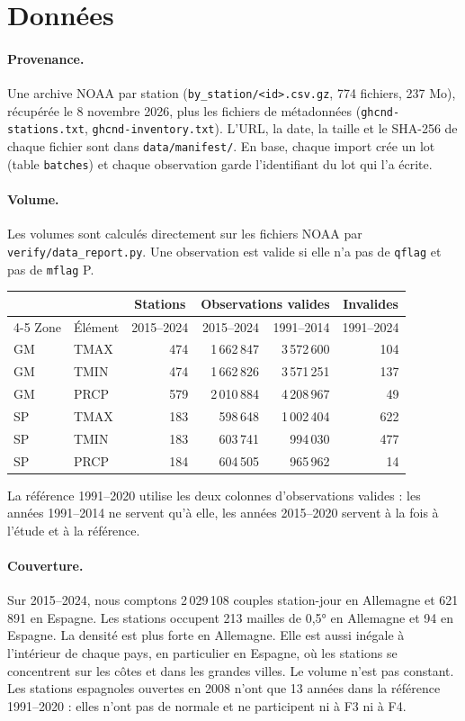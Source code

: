 \documentclass{rapportClass}
\newcommand{\cmd}[1]{\texttt{#1}}
\begin{document}
\section{Données}

\paragraph{Provenance.} Une archive NOAA par station (\cmd{by\_station/<id>.csv.gz}, 774 fichiers, 237 Mo),
récupérée le 8 novembre 2026, plus les fichiers de métadonnées (\cmd{ghcnd-stations.txt}, \cmd{ghcnd-inventory.txt}).
L'URL, la date, la taille et le SHA-256 de chaque fichier sont dans \cmd{data/manifest/}. En base, chaque import
crée un lot (table \cmd{batches}) et chaque observation garde l'identifiant du lot qui l'a écrite.

\paragraph{Volume.} Les volumes sont calculés directement sur les fichiers NOAA par \cmd{verify/data\_report.py}.
Une observation est valide si elle n'a pas de \cmd{qflag} et pas de \cmd{mflag} P.

\begin{table}[H]
\centering\small
\begin{tabular}{llrrrr}
\toprule
 & & \multicolumn{1}{c}{Stations} & \multicolumn{2}{c}{Observations valides} & \multicolumn{1}{c}{Invalides} \\
\cmidrule(lr){4-5}
Zone & Élément & 2015--2024 & 2015--2024 & 1991--2014 & 1991--2024 \\
\midrule
GM & TMAX & 474 & 1\,662\,847 & 3\,572\,600 & 104 \\
GM & TMIN & 474 & 1\,662\,826 & 3\,571\,251 & 137 \\
GM & PRCP & 579 & 2\,010\,884 & 4\,208\,967 & 49 \\
SP & TMAX & 183 & 598\,648 & 1\,002\,404 & 622 \\
SP & TMIN & 183 & 603\,741 & 994\,030 & 477 \\
SP & PRCP & 184 & 604\,505 & 965\,962 & 14 \\
\bottomrule
\end{tabular}
\end{table}
La référence 1991--2020 utilise les deux colonnes d'observations valides : les années 1991--2014 ne servent qu'à
elle, les années 2015--2020 servent à la fois à l'étude et à la référence.

\paragraph{Couverture.} Sur 2015--2024, nous comptons 2\,029\,108 couples station-jour en Allemagne et 621\,891
en Espagne. Les stations occupent 213 mailles de 0,5° en Allemagne et 94 en Espagne. La densité est plus forte en
Allemagne. Elle est aussi inégale à l'intérieur de chaque pays, en particulier en Espagne, où les stations se
concentrent sur les côtes et dans les grandes villes.
Le volume n'est pas constant.
Les stations espagnoles ouvertes en 2008 n'ont que 13 années dans la référence 1991--2020 : elles
n'ont pas de normale et ne participent ni à F3 ni à F4.
\end{document}
